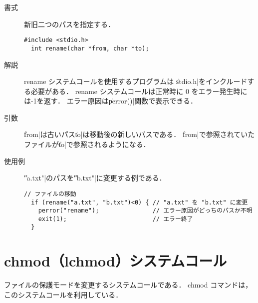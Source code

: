 \begin{description}
\item[書式] 新旧二つのパスを指定する．
\begin{lstlisting}[numbers=none]
  #include <stdio.h>
  int rename(char *from, char *to);
\end{lstlisting}

\item[解説] rename システムコールを使用するプログラムは
\|stdio.h|をインクルードする必要がある．
rename システムコールは正常時に 0 をエラー発生時には-1を返す．
エラー原因は\|perror()|関数で表示できる．

\item[引数] \|from|は古いパス\|to|は移動後の新しいパスである．
\|from|で参照されていたファイルが\|to|で参照されるようになる．

\item[使用例] \|"a.txt"|のパスを\|"b.txt"|に変更する例である．
\begin{lstlisting}[numbers=none]
  // ファイルの移動
  if (rename("a.txt", "b.txt")<0) { // "a.txt" を "b.txt" に変更
    perror("rename");               // エラー原因がどっちのパスか不明
    exit(1);                        // エラー終了
  }
\end{lstlisting}
\end{description}

\section{chmod（lchmod）システムコール}
ファイルの保護モードを変更するシステムコールである．
chmod コマンドは，このシステムコールを利用している．

